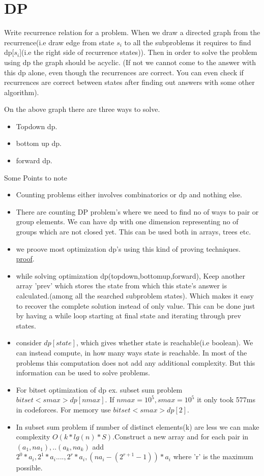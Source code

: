 \documentclass[../Notes.tex]{subfiles}
\begin{document}
\chapter{DP}

Write recurrence relation for a problem. When we draw a directed graph from the recurrence(i.e draw edge from state $s_i$ to all the subproblems it requires to find dp[$s_i$](i.e the right side of recurrence states)). Then in order to solve the problem using dp the graph should be acyclic. (If not we cannot come to the answer with this dp alone, even though the recurrences are correct. You can even check if recurrences are correct between states after finding out answers with some other algorithm).

On the above graph there are three ways to solve.
\begin{itemize}
	\item Topdown dp.
	\item bottom up dp.
	\item forward dp.
\end{itemize}	
Some Points to note
\begin{itemize}
	\item Counting problems either involves combinatorics or dp and nothing else.
	\item There are counting DP problem's where we need to find no of ways to pair or group elements. We can have dp with one dimension representing no of groups which are not closed yet. This can be used both in arrays, trees etc.  
	\item we proove most optimization dp's using this kind of proving techniques.
	\href{Material/dpproof.pdf}{proof}.\pagebreak
	\item while solving optimization dp(topdown,bottomup,forward), Keep another array 'prev' which stores the state from which this state's answer is calculated.(among all the searched subproblem states). Which makes it easy to recover the complete solution instead of only value. This can be done just by having a while loop starting at final state and iterating through prev states.
	\item consider $dp[state]$, which gives whether state is reachable(i.e boolean). We can instead compute, in how many ways state is reachable. In most of the problems this computation does not add any additional complexity. But this information can be used to solve problems.   
	\item For bitset optimization of dp ex. subset sum problem $bitset<smax> dp[nmax]$. If $nmax = 10^5, smax = 10^5$ it only took 577ms in codeforces. For memory use $bitset<smax> dp[2]$. 
	\item In subset sum problem if number of distinct elements(k) are less we can make complexity $O(k*lg(n)*S)$.Construct a new array and for each pair in $(a_1,na_1),..(a_k,na_k)$ add $2^0*a_i, 2^1*a_i...., 2^r*a_i, (na_i-(2^{r+1}-1))*a_i$ where 'r' is the maximum possible.
\end{itemize}
\end{document}
